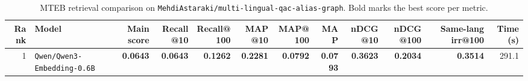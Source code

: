 \begin{table}[t]
\centering
\small
\begin{tabular}{r l r r r r r r r r r r}
\hline
Rank & Model & Main score & Recall@10 & Recall@100 & MAP@10 & MAP@100 & MAP & nDCG@10 & nDCG@100 & Same-lang irr@100 & Time (s) \\
\hline
1 & \texttt{Qwen/Qwen3-Embedding-0.6B} & \textbf{0.0643} & \textbf{0.0643} & \textbf{0.1262} & \textbf{0.2281} & \textbf{0.0792} & \textbf{0.0793} & \textbf{0.3623} & \textbf{0.2034} & \textbf{0.3514} & 291.1 \\
\hline
\end{tabular}
\caption{MTEB retrieval comparison on \texttt{MehdiAstaraki/multi-lingual-qac-alias-graph}. Bold marks the best score per metric.}
\label{tab:mteb-model-comparison}
\end{table}
